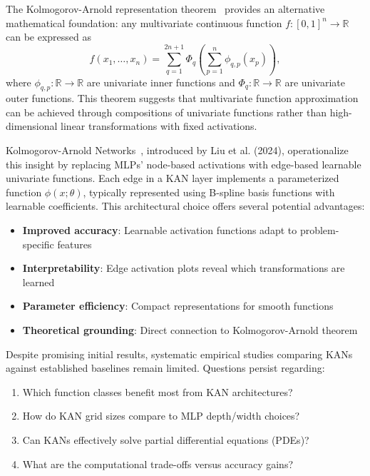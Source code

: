 \documentclass[11pt,a4paper]{article}
\newcommand{\R}{\mathbb{R}}
\begin{document}
The Kolmogorov-Arnold representation theorem~\citep{liu2024kan} provides an alternative mathematical foundation: any multivariate continuous function $f: [0,1]^n \to \R$ can be expressed as
\begin{equation}
f(x_1, \ldots, x_n) = \sum_{q=1}^{2n+1} \Phi_q\left(\sum_{p=1}^n \phi_{q,p}(x_p)\right),
\end{equation}
where $\phi_{q,p}: \R \to \R$ are univariate inner functions and $\Phi_q: \R \to \R$ are univariate outer functions. This theorem suggests that multivariate function approximation can be achieved through compositions of univariate functions rather than high-dimensional linear transformations with fixed activations.

Kolmogorov-Arnold Networks~\citep{liu2024kan}, introduced by Liu et al. (2024), operationalize this insight by replacing MLPs' node-based activations with edge-based learnable univariate functions. Each edge in a KAN layer implements a parameterized function $\phi(x; \theta)$, typically represented using B-spline basis functions with learnable coefficients. This architectural choice offers several potential advantages:
\begin{itemize}
    \item \textbf{Improved accuracy}: Learnable activation functions adapt to problem-specific features
    \item \textbf{Interpretability}: Edge activation plots reveal which transformations are learned
    \item \textbf{Parameter efficiency}: Compact representations for smooth functions
    \item \textbf{Theoretical grounding}: Direct connection to Kolmogorov-Arnold theorem
\end{itemize}

Despite promising initial results, systematic empirical studies comparing KANs against established baselines remain limited. Questions persist regarding:
\begin{enumerate}
    \item Which function classes benefit most from KAN architectures?
    \item How do KAN grid sizes compare to MLP depth/width choices?
    \item Can KANs effectively solve partial differential equations (PDEs)?
    \item What are the computational trade-offs versus accuracy gains?
\end{enumerate}
\end{document}
